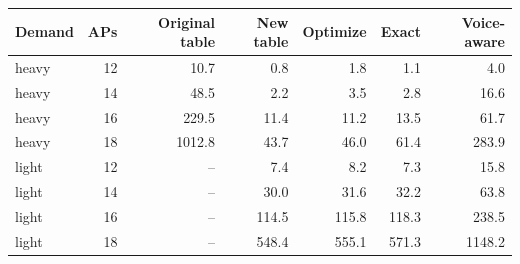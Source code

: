 \begin{tabular}{lrrrrrr}
\toprule
Demand & APs & Original table & New table & Optimize & Exact & Voice-aware \\
\midrule
heavy & 12 & 10.7 & 0.8 & 1.8 & 1.1 & 4.0 \\
heavy & 14 & 48.5 & 2.2 & 3.5 & 2.8 & 16.6 \\
heavy & 16 & 229.5 & 11.4 & 11.2 & 13.5 & 61.7 \\
heavy & 18 & 1012.8 & 43.7 & 46.0 & 61.4 & 283.9 \\
light & 12 & -- & 7.4 & 8.2 & 7.3 & 15.8 \\
light & 14 & -- & 30.0 & 31.6 & 32.2 & 63.8 \\
light & 16 & -- & 114.5 & 115.8 & 118.3 & 238.5 \\
light & 18 & -- & 548.4 & 555.1 & 571.3 & 1148.2 \\
\bottomrule
\end{tabular}
